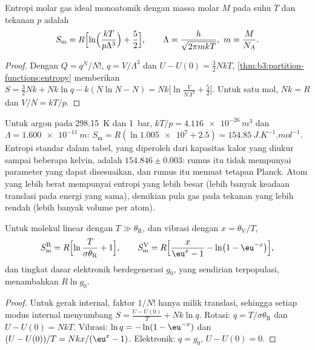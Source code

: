 \begin{theorem}\label{thm:b3:partition-functions:sackur-tetrode}
Entropi molar gas ideal monoatomik dengan massa molar $M$ pada suhu $T$ dan
tekanan $p$ adalah
\[
  S_{\mathrm m} = R\Bigl[\ln\Bigl(\frac{kT}{p\Lambda^3}\Bigr) + \frac52\Bigr],
  \qquad \Lambda = \frac{h}{\sqrt{2\pi mkT}},\ m = \frac{M}{N_A}.
\]
\end{theorem}

\begin{proof}
Dengan $Q = q^N/N!$, $q = V/\Lambda^3$ dan $U - U(0) = \frac32NkT$,
\cref{thm:b3:partition-functions:entropy} memberikan $S = \frac32Nk + Nk\ln q - k(N\ln N - N) =
Nk\bigl[\ln\frac{V}{N\Lambda^3} + \frac52\bigr]$. Untuk satu mol, $Nk = R$ dan $V/N = kT/p$.
\end{proof}

Untuk argon pada \qty{298.15}{K} dan \qty{1}{bar}, $kT/p = \qty{4.116e-26}{m^3}$ dan
$\Lambda =
\qty{1.600e-11}{m}$: $S_{\mathrm m} = R(\ln\num{1.005e7} + 2.5) = \qty{154.85}{J.K^{-1}.mol^{-1}}$.
Entropi standar dalam tabel, yang diperoleh dari kapasitas kalor yang diukur
sampai beberapa kelvin, adalah $154.846 \pm 0.003$: rumus itu tidak mempunyai
parameter yang dapat disesuaikan, dan rumus itu memuat tetapan Planck. Atom
yang lebih berat mempunyai entropi yang lebih besar (lebih banyak keadaan
translasi pada energi yang sama), demikian pula gas pada tekanan yang lebih
rendah (lebih banyak volume per atom).

\begin{proposition}\label{prop:b3:partition-functions:modes-entropy}
Untuk molekul linear dengan $T \gg \theta_{\mathrm R}$, dan vibrasi dengan
$x = \theta_{\mathrm V}/T$,
\[
  S^{\mathrm R}_{\mathrm m} = R\Bigl[\ln\frac{T}{\sigma\theta_{\mathrm R}} + 1\Bigr],
  \qquad
  S^{\mathrm V}_{\mathrm m} = R\Bigl[\frac{x}{\eu^x - 1} - \ln\bigl(1 - \eu^{-x}\bigr)\Bigr],
\]
dan tingkat dasar elektronik berdegenerasi $g_0$, yang sendirian terpopulasi,
menambahkan $R\ln g_0$.
\end{proposition}

\begin{proof}
Untuk gerak internal, faktor $1/N!$ hanya milik translasi, sehingga setiap
modus internal menyumbang $S = \frac{U - U(0)}{T} + Nk\ln q$. Rotasi:
$q = T/\sigma\theta_{\mathrm R}$ dan $U - U(0) = NkT$. Vibrasi: $\ln q = -\ln(1 - \eu^{-x})$
dan $(U - U(0))/T = Nkx/(\eu^x - 1)$. Elektronik: $q = g_0$, $U - U(0) = 0$.
\end{proof}

